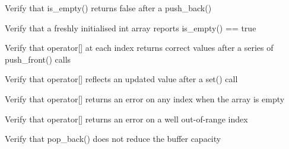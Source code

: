 \begin{DoxyRefList}
%
Verify that is\+\_\+empty() returns false after a push\+\_\+back()  
\item[Global \doxylink{test__array_8cpp_a48d25280b070c1415161b4d2d19377d0}{TEST\+\_\+F} (\doxylink{classArrayInitTest}{Array\+Init\+Test}, Is\+Empty\+True\+On\+Fresh\+Int\+Array)]\label{test__test000071}%
%
Verify that a freshly initialised int array reports is\+\_\+empty() == true  
\item[Global \doxylink{test__array_8cpp_ab791467916ee384edf3350a7d82c27fa}{TEST\+\_\+F} (\doxylink{classArrayInitTest}{Array\+Init\+Test}, Operator\+Bracket\+After\+Push\+Front\+Returns\+Correct\+Order)]\label{test__test000070}%
%
Verify that operator\mbox{[}\mbox{]} at each index returns correct values after a series of push\+\_\+front() calls  
\item[Global \doxylink{test__array_8cpp_a86e5dad514480d65c42cf47bcc2680b6}{TEST\+\_\+F} (\doxylink{classArrayInitTest}{Array\+Init\+Test}, Operator\+Bracket\+Reflects\+Set\+Update)]\label{test__test000069}%
%
Verify that operator\mbox{[}\mbox{]} reflects an updated value after a set() call  
\item[Global \doxylink{test__array_8cpp_ae0572d3d1a9de640192d6ed646e12099}{TEST\+\_\+F} (\doxylink{classArrayInitTest}{Array\+Init\+Test}, Operator\+Bracket\+On\+Empty\+Array\+Returns\+Error)]\label{test__test000068}%
%
Verify that operator\mbox{[}\mbox{]} returns an error on any index when the array is empty  
\item[Global \doxylink{test__array_8cpp_a79887ca47e09af172a825c5599efb711}{TEST\+\_\+F} (\doxylink{classArrayInitTest}{Array\+Init\+Test}, Operator\+Bracket\+Far\+Out\+Of\+Range\+Returns\+Error)]\label{test__test000067}%
%
Verify that operator\mbox{[}\mbox{]} returns an error on a well out-\/of-\/range index  
\item[Global \doxylink{test__array_8cpp_aa8b390c53c3be5615a1417931a5a3c1f}{TEST\+\_\+F} (\doxylink{classArrayInitTest}{Array\+Init\+Test}, Pop\+Back\+Does\+Not\+Reduce\+Capacity)]\label{test__test000038}%
%
Verify that pop\+\_\+back() does not reduce the buffer capacity  
\item[Global \doxylink{test__array_8cpp_a295f65aa8ec31b48545128dd12719095}{TEST\+\_\+F} (\doxylink{classArrayInitTest}{Array\+Init\+Test}, Operator\+Bracket\+Point\+Returns\+Correct\+Values)]\label{test__test000065}%

\end{DoxyRefList}
